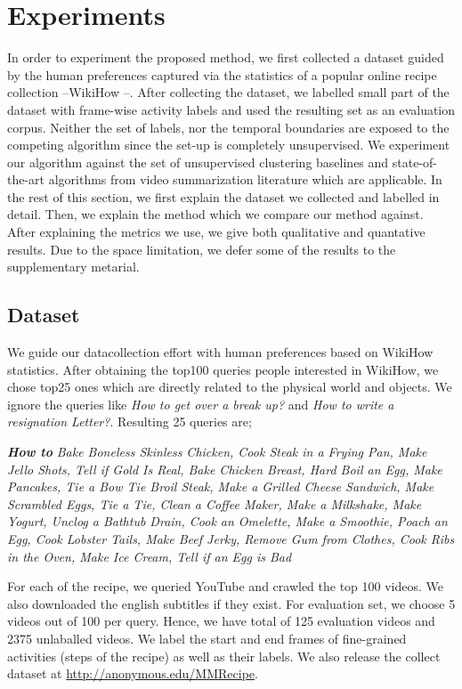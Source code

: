 \section{Experiments}
In order to experiment the proposed method, we first collected a dataset guided by the human preferences captured via the statistics of a popular online recipe collection --WikiHow \cite{wikiHow}--. After collecting the dataset, we labelled small part of the dataset with frame-wise activity labels and used the resulting set as an evaluation corpus. Neither the set of labels, nor the temporal boundaries are exposed to the competing algorithm since the set-up is completely unsupervised. We experiment our algorithm against the set of unsupervised clustering baselines and state-of-the-art algorithms from video summarization literature which are applicable. In the rest of this section, we first explain the dataset we collected and labelled in detail. Then, we explain the method which we compare our method against. After explaining the metrics we use, we give both qualitative and quantative results. Due to the space limitation, we defer some of the results to the supplementary metarial.

\subsection{Dataset}
We guide our datacollection effort with human preferences based on WikiHow \cite{wikiHow} statistics. After obtaining the top100 queries people interested in WikiHow, we chose top25 ones which are directly related to the physical world and objects. We ignore the queries like \emph{How to get over a break up‏?‎} and \emph{How to write a resignation Letter?}. Resulting 25 queries are;


\emph{\textbf{How to}}\footnotesize
\emph{Bake Boneless Skinless Chicken, Cook Steak in a Frying Pan, Make Jello Shots, Tell if Gold Is Real, Bake Chicken Breast, Hard Boil an Egg, Make Pancakes, Tie a Bow Tie
Broil Steak, Make a Grilled Cheese Sandwich, Make Scrambled Eggs, Tie a Tie, Clean a Coffee Maker, Make a Milkshake, Make Yogurt, Unclog a Bathtub Drain, Cook an Omelette,
Make a Smoothie, Poach an Egg, Cook Lobster Tails, Make Beef Jerky, Remove Gum from Clothes, Cook Ribs in the Oven, Make Ice Cream, Tell if an Egg is Bad}
\normalsize

For each of the recipe, we queried YouTube and crawled the top 100 videos. We also downloaded the english subtitles if they exist. For evaluation set, we choose 5 videos out of 100 per query. Hence, we have total of 125 evaluation videos and 2375 unlaballed videos. We label the start and end frames of fine-grained activities (\ie steps of the recipe) as well as their labels. We also release the collect dataset at \url{http://anonymous.edu/MMRecipe}.


